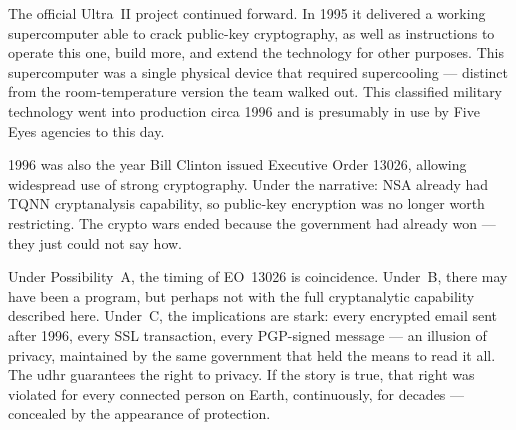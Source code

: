 The official Ultra~II project continued forward. In 1995 it delivered a working supercomputer able to crack public-key cryptography, as well as instructions to operate this one, build more, and extend the technology for other purposes. This supercomputer was a single physical device that required supercooling --- distinct from the room-temperature version the team walked out. This classified military technology went into production circa 1996 and is presumably in use by Five Eyes agencies to this day.

1996 was also the year Bill Clinton issued Executive Order 13026, allowing widespread use of strong cryptography. Under the narrative: NSA already had TQNN cryptanalysis capability, so public-key encryption was no longer worth restricting. The crypto wars ended because the government had already won --- they just could not say how.

Under Possibility~A, the timing of EO~13026 is coincidence. Under~B, there may have been a program, but perhaps not with the full cryptanalytic capability described here. Under~C, the implications are stark: every encrypted email sent after 1996, every SSL transaction, every PGP-signed message --- an illusion of privacy, maintained by the same government that held the means to read it all. The \gls{udhr} guarantees the right to privacy. If the story is true, that right was violated for every connected person on Earth, continuously, for decades --- concealed by the appearance of protection.

\chapterreturn
